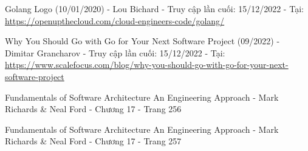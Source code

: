 \begin{thebibliography}{9}
    Golang Logo (10/01/2020) - Lou Bichard - Truy cập lần cuối: 15/12/2022 - Tại: \url{https://openupthecloud.com/cloud-engineers-code/golang/}

    Why You Should Go with Go for Your Next Software Project (09/2022) - Dimitar Grancharov - Truy cập lần cuối: 15/12/2022 - Tại: \url{https://www.scalefocus.com/blog/why-you-should-go-with-go-for-your-next-software-project}

    Fundamentals of Software Architecture An Engineering Approach - Mark Richards \& Neal Ford - Chương 17 - Trang 256
    
    Fundamentals of Software Architecture An Engineering Approach - Mark Richards \& Neal Ford - Chương 17 - Trang 257



\end{thebibliography}
